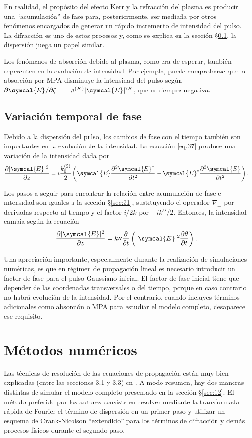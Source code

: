 \documentclass{scrartcl} %
\newcommand*{\pdv}[2]{\frac{\partial#1}{\partial#2}}
\newcommand*{\pdvN}[3]{\frac{\partial^{#3}#1}{\partial{#2}^{#3}}}
\newcommand*{\grad}{\nabla}
\begin{document}
En realidad, el propósito del efecto Kerr y la refracción del plasma es producir una \enquote{acumulación} de fase para, posteriormente, ser mediada por otros fenómenos encargados de generar un rápido incremento de intensidad del pulso. La difracción es uno de estos procesos y, como se explica en la sección \S\ref{sec:32}, la dispersión juega un papel similar.

Los fenómenos de absorción debido al plasma, como era de esperar, también repercuten en la evolución de intensidad. Por ejemplo, puede comprobarse que la absorción por MPA disminuye la intensidad del pulso según $\partial \symcal{E}/\partial \zeta = -\beta^{(K)}|\symcal{E}|^{2K}$, que es siempre negativa.

\subsection{Variación temporal de fase}\label{sec:32}
Debido a la dispersión del pulso, los cambios de fase con el tiempo también son importantes en la evolución de la intensidad. La ecuación \eqref{eq:37} produce una variación de la intensidad dada por
\begin{equation}\label{eq:48}
  \pdv{|\symcal{E}|^{2}}{z} = i \frac{k^{(2)}_{0}}{2} \left(\symcal{E}\pdvN{\symcal{E}^{*}}{t}{2} - \symcal{E}^{*}\pdvN{\symcal{E}}{t}{2}\right).
\end{equation}

Los pasos a seguir para encontrar la relación entre acumulación de fase e intensidad son iguales a la sección \S\ref{sec:31}, sustituyendo el operador $\grad_{\perp}$ por derivadas respecto al tiempo y el factor $i/2k$ por $-ik \prime \prime/2$. Entonces, la intensidad cambia según la ecuación
\begin{equation}\label{eq:49}
  \pdv{|\symcal{E}|^{2}}{z} = k \prime \prime \frac{\partial}{\partial t} \left(|\symcal{E}|^{2}\pdv{\theta}{t}\right).
\end{equation}

Una apreciación importante, especialmente durante la realización de simulaciones numéricas, es que en régimen de propagación lineal es necesario introducir un factor de fase para el pulso Gaussiano inicial. El factor de fase inicial tiene que depender de las coordenadas transversales o del tiempo, porque en caso contrario no habrá evolución de la intensidad. Por el contrario, cuando incluyes términos adicionales como absorción o MPA para estudiar el modelo completo, desaparece ese requisito.

\section{Métodos numéricos}\label{sec:4}
Las técnicas de resolución de las ecuaciones de propagación están muy bien explicadas (entre las secciones 3.1 y 3.3) en \cite{Couairon2011}. A modo resumen, hay dos maneras distintas de simular el modelo completo presentado en la sección \S\ref{sec:12}. El método preferido por los autores consiste en resolver mediante la transformada rápida de Fourier el término de dispersión en un primer paso y utilizar un esquema de Crank-Nicolson \enquote{extendido} para los términos de difracción y demás procesos físicos durante el segundo paso.
\end{document}
